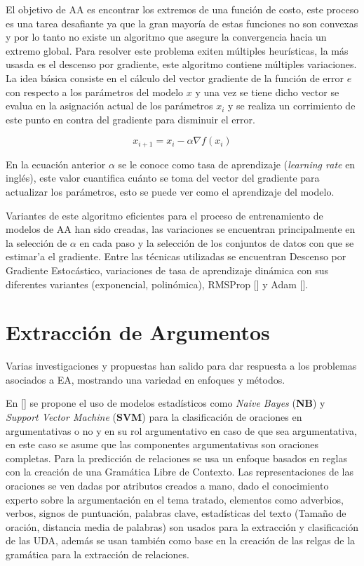 El objetivo de AA es encontrar los extremos de una función de costo, este proceso es una tarea 
desafiante ya que la gran mayoría de estas funciones no son convexas y por lo tanto no existe un algoritmo
que asegure la convergencia hacia un extremo global. Para resolver este problema exiten múltiples heurísticas,
la más usasda es el descenso por gradiente, este algoritmo contiene múltiples variaciones. La idea básica consiste 
en el cálculo del vector gradiente de la función de error $e$ con respecto a los parámetros del modelo $x$ y una vez se 
tiene dicho vector se evalua en la asignación actual de los parámetros $x_i$ y se realiza un corrimiento de este punto 
en contra del gradiente para disminuir el error.

\begin{equation}
	x_{i+1} = x_i - \alpha \nabla f(x_i)
\end{equation}\label{eq:gradien_descent}

En la ecuación anterior $\alpha$ se le conoce como tasa de aprendizaje (\emph{learning rate} en inglés),
este valor cuantifica cuánto se toma del vector del gradiente para actualizar los parámetros, esto 
se puede ver como el aprendizaje del modelo.

Variantes de este algoritmo eficientes para el proceso de entrenamiento de modelos de AA han sido 
creadas, las variaciones se encuentran principalmente en la selección de $\alpha$ en cada paso y la 
selección de los conjuntos de datos con que se estimar'a el gradiente. Entre las técnicas utilizadas se 
encuentran Descenso por Gradiente Estocástico, variaciones de tasa de aprendizaje dinámica con 
sus diferentes variantes (exponencial, polinómica), RMSProp [\cite{tieleman2012rmsp}] 
y Adam [\cite{kingma2014adam}].

\section{Extracción de Argumentos}

Varias investigaciones y propuestas han salido para dar respuesta a los problemas asociados a EA, mostrando
una variedad en enfoques y métodos.

En [\cite{palau2009argumentation}] se propone
el uso de modelos estadísticos como \emph{Naive Bayes} (\textbf{NB}) y \emph{Support Vector Machine} (\textbf{SVM}) 
para la clasificación de 
oraciones en argumentativas o no y en su rol argumentativo en caso de que sea argumentativa, en este
caso se asume que las componentes argumentativas son oraciones completas. Para la predicción de relaciones
se usa un enfoque basados en reglas con la creación de una Gramática Libre de Contexto. Las representaciones
de las oraciones se ven dadas por atributos creados a mano, dado el conocimiento experto sobre la argumentación
en el tema tratado, elementos como adverbios, verbos, signos de puntuación, palabras clave, estadísticas del texto
(Tamaño de oración, distancia media de palabras) son usados para la extracción y clasificación de las UDA, además
se usan también como base en la creación de las relgas de la gramática para la extracción de relaciones.

